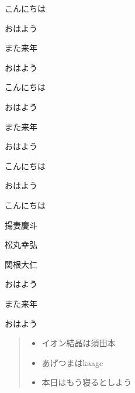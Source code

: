 \documentclass[book, twoside, paper=b5j, fleqn, jafontsize=9pt, jafontscale=1, head_space=22mm, foot_space=9mm, fore-edge=16mm, gutter=25mm, hanging_punctuation]{jlreq}
\newenvironment{enumerate-brackets}{\begin{enumerate}\renewcommand{\labelenumi}{\ajKakko{\arabic{enumi}}~}}{\end{enumerate}}
\newenvironment{enumerate-circle}{\begin{enumerate}\renewcommand{\labelenumi}{\ajMaru{\arabic{enumi}}~}}{\end{enumerate}}
\newenvironment{enumerate-square}{\begin{enumerate}\renewcommand{\labelenumi}{\ajKaku{\arabic{enumi}}~}}{\end{enumerate}}
\newenvironment{enumerate-alphabet}{\begin{enumerate}\renewcommand{\labelenumii}{\ajKakkoalph{\arabic{enumii}}~}}{\end{enumerate}}
\begin{document}
\begin{enumerate-brackets}
    \item こんにちは
    \item おはよう
    \item また来年
    \item おはよう
\end{enumerate-brackets}
\begin{enumerate-circle}
    \item こんにちは
    \item おはよう
    \item また来年
    \item おはよう
\end{enumerate-circle}
\begin{enumerate-square}
    \item こんにちは
    \begin{enumerate-alphabet}
        \item おはよう
        \item こんにちは
        \item 揚妻慶斗
        \item 松丸幸弘
        \item 関根大仁
    \end{enumerate-alphabet}
    \item おはよう
    \item また来年
    \item おはよう
\end{enumerate-square}
\begin{quote}
\begin{itemize}
    \item イオン結晶は須田本
    \item あげつまはkaage
    \item 本日はもう寝るとしよう
\end{itemize}
\end{quote}
\end{document}
